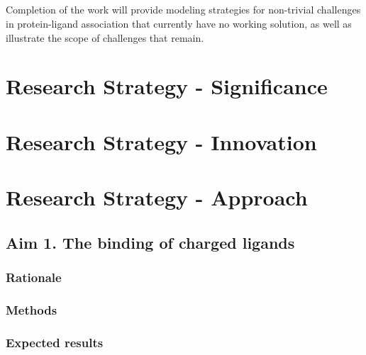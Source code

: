 \documentclass[10pt]{article}
\newif\ifinstr
\newcommand{\instr}[1]{\ifinstr {\color{cyan}\emph{#1}} \fi}
\begin{document}
\subsection*{}

Completion of the work will provide modeling strategies for non-trivial challenges in protein-ligand association that currently have no working solution, as well as illustrate the scope of challenges that remain.

\section*{Research Strategy - Significance}
\instr{General background, significance in terms of basic science and disease relevance.}

\section*{Research Strategy - Innovation}
\instr{Explain how your proposal differs from what others have tried.}

\section*{Research Strategy - Approach}
\instr{Approach: More specific background information. Describe in detail the experimental design and research methods to be used. Technical hurdles to be overcome should be mentioned. Alternative approaches should be given for experiments that may not be feasible. Discussion of expected or possible results and their interpretation. Best format for each specific aim: a) rationale, b) methods, c) expected results, d) alternatives. Theory aims should follow a similar structure where possible.}

\subsection*{Aim 1. The binding of charged ligands}
\subsubsection*{Rationale}
\subsubsection*{Methods}
\subsubsection*{Expected results}
\end{document}
